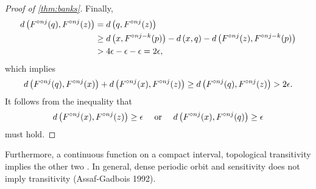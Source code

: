 \documentclass[12pt,draft,twoside]{book}
\begin{document}
\begin{proof}[Proof of \ref{thm:banks}]
    Finally, 
    \begin{align*}
      d\left( F^{\circ nj}(q), F^{\circ nj}(z) \right) 
      &= d\left( q, F^{\circ nj}(z) \right)  \\
      &\geq  d\left( x, F^{\circ nj-k}(p) \right) - d\left( x,q \right) - d\left( F^{\circ nj}(z), F^{\circ nj - k}(p) \right)  \\
      &> 4\epsilon - \epsilon - \epsilon 
      = 2\epsilon,
    \end{align*}
    which implies
    \begin{equation*}
      d\left( F^{\circ nj}(q), F^{\circ nj}(x) \right) + d\left( F^{\circ nj}(x), F^{\circ nj}(z) \right) 
      \geq d\left( F^{\circ nj}(q), F^{\circ nj}(z) \right)
      > 2\epsilon.
    \end{equation*}
    It follows from the inequality that 
    \begin{equation*}
      d\left( F^{\circ nj}(x), F^{\circ nj}(z) \right) \geq \epsilon \quad\mbox{ or }\quad d\left( F^{\circ nj}(x), F^{\circ nj}(q) \right) \geq \epsilon 
    \end{equation*}
     must hold.
  \end{proof}

   Furthermore, a continuous function on a compact interval, topological transitivity implies the other two \citep{silverman}.
   In general, dense periodic orbit and sensitivity does not imply transitivity (Assaf-Gadbois 1992).
\end{document}
